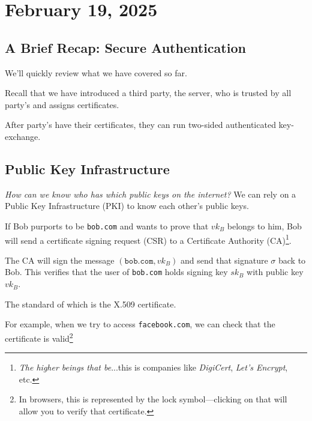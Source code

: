\section{February 19, 2025}
\label{20250219}

\subsection{A Brief Recap: Secure Authentication}

We'll quickly review what we have covered so far.

Recall that we have introduced a third party, the server, who is trusted by all party's and assigns certificates.


After party's have their certificates, they can run two-sided authenticated key-exchange.


\subsection{Public Key Infrastructure}

\emph{How can we know who has which public keys on the internet?} We can rely on a Public Key Infrastructure (PKI) to know each other's public keys.

If Bob purports to be \texttt{bob.com} and wants to prove that $vk_B$ belongs to him, Bob will send a certificate signing request (CSR) to a Certificate Authority (CA)\footnote{\emph{The higher beings that be}...this is companies like \emph{DigiCert}, \emph{Let's Encrypt}, etc.}.

The CA will sign the message $(\mathtt{bob.com}, vk_B)$ and send that signature $\sigma$ back to Bob. This verifies that the user of \texttt{bob.com} holds signing key $sk_B$ with public key $vk_B$.


The standard of which is the X.509 certificate.

For example, when we try to access \texttt{facebook.com}, we can check that the certificate is valid\footnote{In browsers, this is represented by the lock symbol---clicking on that will allow you to verify that certificate.}



